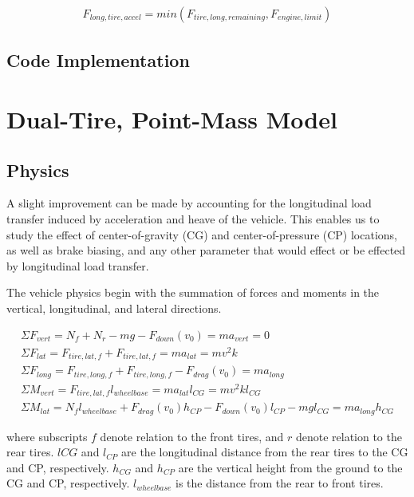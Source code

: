 \documentclass{article}
\begin{document}
\begin{align}
	F_{long,tire,accel} = min(F_{tire,long,remaining}, F_{engine,limit})
\end{align}

\subsection{Code Implementation}

\section{Dual-Tire, Point-Mass Model}

\subsection{Physics}

A slight improvement can be made by accounting for the longitudinal load transfer induced by acceleration and heave of the vehicle. This enables us to study the effect of center-of-gravity (CG) and center-of-pressure (CP) locations, as well as brake biasing, and any other parameter that would effect or be effected by longitudinal load transfer.

The vehicle physics begin with the summation of forces and moments in the vertical, longitudinal, and lateral directions.

\begin{align}
	\Sigma F_{vert} = N_{f} + N_{r} - m g - F_{down}(v_0) = m a_{vert} = 0 \\
	\Sigma F_{lat}  = F_{tire,lat,f} + F_{tire,lat,f} = m a_{lat} = m v^2 k \\
	\Sigma F_{long} = F_{tire,long,f} + F_{tire,long,f} - F_{drag}(v_0) = m a_{long} \\	
	\Sigma M_{vert} = F_{tire,lat,f} l_{wheelbase} = m a_{lat} l_{CG} = m v^2 k l_{CG}\\
	\Sigma M_{lat}  = N_{f} l_{wheelbase} + F_{drag}(v_0) h_{CP} - F_{down}(v_0) l_{CP} - m g l_{CG} = m a_{long} h_{CG}
\end{align}

where subscripts $f$ denote relation to the front tires, and $r$ denote relation to the rear tires. $l{CG}$ and $l_{CP}$ are the longitudinal distance from the rear tires to the CG and CP, respectively. $h_{CG}$ and $h_{CP}$ are the vertical height from the ground to the CG and CP, respectively. $l_{wheelbase}$ is the distance from the rear to front tires.
\end{document}
